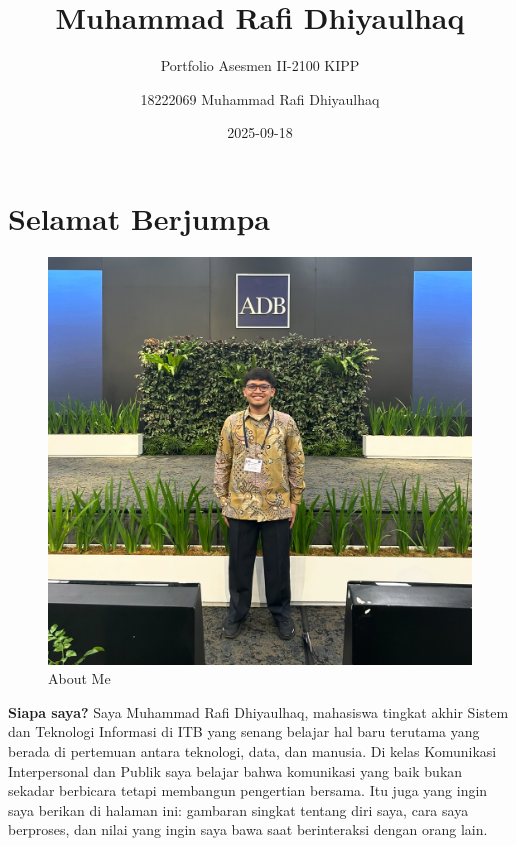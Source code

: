 \documentclass[
  letterpaper,
  DIV=11,
  numbers=noendperiod]{scrreprt}
\title{Muhammad Rafi Dhiyaulhaq}
\subtitle{Portfolio Asesmen II-2100 KIPP}
\author{18222069 Muhammad Rafi Dhiyaulhaq}
\date{2025-09-18}
\renewcommand*\contentsname{Table of contents}
\newcommand\contentsname{Table of contents}
\begin{document}
\maketitle

\renewcommand*\contentsname{Table of contents}
{
\hypersetup{linkcolor=}
\setcounter{tocdepth}{2}
\tableofcontents
}


\chapter*{Selamat Berjumpa}\label{selamat-berjumpa}


\begin{figure}[H]

{\centering \includegraphics[width=0.95\linewidth,height=\textheight,keepaspectratio]{images/rafi.jpg}

}

\caption{About Me}

\end{figure}%

\textbf{Siapa saya?} Saya Muhammad Rafi Dhiyaulhaq, mahasiswa tingkat
akhir Sistem dan Teknologi Informasi di ITB yang senang belajar hal baru
terutama yang berada di pertemuan antara teknologi, data, dan manusia.
Di kelas Komunikasi Interpersonal dan Publik saya belajar bahwa
komunikasi yang baik bukan sekadar berbicara tetapi membangun pengertian
bersama. Itu juga yang ingin saya berikan di halaman ini: gambaran
singkat tentang diri saya, cara saya berproses, dan nilai yang ingin
saya bawa saat berinteraksi dengan orang lain.
\end{document}
